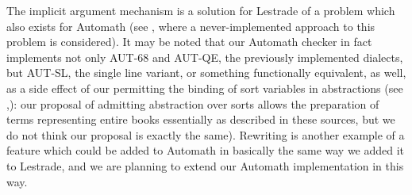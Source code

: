\documentclass{article}
\begin{document}
The implicit argument mechanism is a solution for Lestrade of a problem which also exists for Automath (see \cite{autsynt}, where a never-implemented approach to this problem is considered).  It may be noted that our Automath checker in fact implements not only AUT-68 and AUT-QE, the previously implemented dialects, but AUT-SL, the single line variant, or something functionally equivalent, as well, as a side effect of our permitting the binding of sort variables in abstractions (see \cite{autsl},\cite{autlambda}):   our proposal of admitting abstraction over sorts allows the preparation of terms representing entire books essentially as described in these sources, but we do not think our proposal is exactly the same).  Rewriting is another example of a feature which could be added to Automath in basically the same way we added it to Lestrade, and we are planning to extend our Automath implementation in this way.
\end{document}
